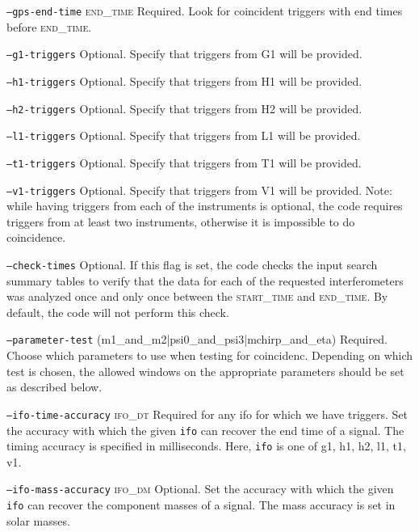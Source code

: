 \begin{entry}
\begin{entry}
\item[\texttt{--gps-end-time} \textsc{end\_time}] Required.  Look for
coincident triggers with end times before \textsc{end\_time}.


\item[\texttt{--g1-triggers}] Optional.  Specify that triggers from G1 will be
provided.

\item[\texttt{--h1-triggers}] Optional.  Specify that triggers from H1 will be
provided.
\item[\texttt{--h2-triggers}] Optional.  Specify that triggers from H2 will be
provided.

\item[\texttt{--l1-triggers}] Optional.  Specify that triggers from L1 will be
provided.
\item[\texttt{--t1-triggers}] Optional.  Specify that triggers from T1 will be
provided.
\item[\texttt{--v1-triggers}] Optional.  Specify that triggers from V1 will be
provided.  Note: while having triggers from each of the instruments is
optional, the code requires triggers from at least two instruments, otherwise
it is impossible to do coincidence.

\item[\texttt{--check-times}] Optional.  If this flag is set, the code checks
the input search summary tables to verify that the data for each of the
requested interferometers was analyzed once and only once between the
\textsc{start\_time} and \textsc{end\_time}.  By default, the code will not
perform this check.

\item[\texttt{--parameter-test}
(m1\_and\_m2|psi0\_and\_psi3|mchirp\_and\_eta)]
Required. Choose which parameters to use when testing for coincidenc.
Depending on which test is chosen, the allowed windows on the appropriate
parameters should be set as described below.

\item[\texttt{--ifo-time-accuracy} \textsc{ifo\_dt}] Required for any ifo for
which we have triggers. Set the accuracy with which the given \texttt{ifo} can
recover the end time of a signal.  The timing accuracy is specified in
milliseconds. Here, \texttt{ifo} is one of g1, h1, h2, l1, t1, v1.

\item[\texttt{--ifo-mass-accuracy} \textsc{ifo\_dm}] Optional. Set the
accuracy with which the given \texttt{ifo} can recover the component masses of
a signal.  The mass accuracy is set in solar masses.


\end{entry}
\end{entry}
